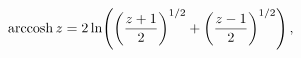 \[\mathop{\mathrm{arccosh}\/}\nolimits z=2\mathop{\ln\/}\nolimits\!\left(\left(%
\frac{z+1}{2}\right)^{1/2}+\left(\frac{z-1}{2}\right)^{1/2}\right),\]